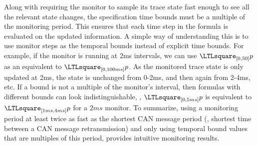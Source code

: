 Along with requiring the monitor to sample its trace state fast enough to see all the relevant state changes, the specification time bounds must be a multiple of the monitoring period.
This ensures that each time step in the formula is evaluated on the updated information.
A simple way of understanding this is to use monitor steps as the temporal bounds instead of explicit time bounds.
For example, if the monitor is running at  2ms intervals, we can use $\henceforth_{[0,50]} p$ as an equivalent to
$\henceforth_{[0,100ms]} p$.
As the monitored trace state is only updated at 2ms, the state is unchanged
from 0-2ms, and then again from 2-4ms, etc.
If a bound is not a multiple of the monitor's interval, then formulas with
different bounds can look indistinguishable,
\eg, $\henceforth_{[0,5ms]} p$ is equivalent to $\henceforth_{[1ms,4ms]} p$
for a $2ms$ monitor.
%
To summarize, using a monitoring period at least twice as fast as the shortest
CAN message period (\ie, shortest time between a CAN message retransmission)
and only using temporal bound values that are multiples of this period, provides
intuitive monitoring results.


